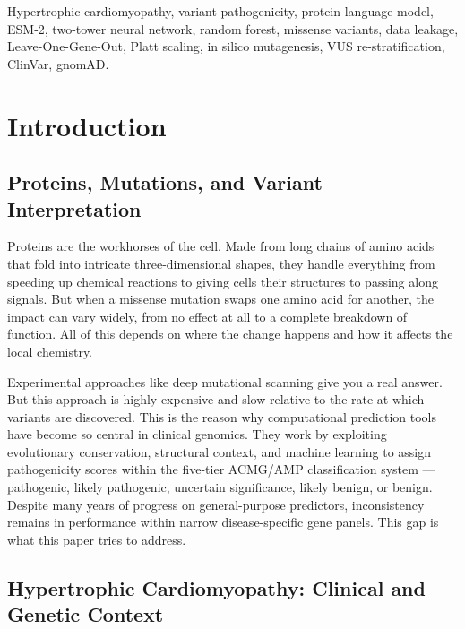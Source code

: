 \documentclass[conference]{IEEEtran}
\begin{document}
\begin{IEEEkeywords}
Hypertrophic cardiomyopathy, variant pathogenicity, protein language
model, ESM-2, two-tower neural network, random forest, missense
variants, data leakage, Leave-One-Gene-Out, Platt scaling, in silico
mutagenesis, VUS re-stratification, ClinVar, gnomAD.
\end{IEEEkeywords}

\section{Introduction}

\subsection{Proteins, Mutations, and Variant Interpretation}

Proteins are the workhorses of the cell. Made from long chains of amino acids that fold into intricate three-dimensional shapes, they handle everything from speeding up chemical reactions to giving cells their structures to passing along signals. But when a missense mutation swaps one amino acid for another, the impact can vary widely, from no effect at all to a complete breakdown of function. All of this depends on where the change happens and how it affects the local chemistry.

Experimental approaches like deep mutational scanning \cite{fowler2014deep} give you a real answer. But this approach is highly expensive and slow relative to the rate at which variants are discovered. This is the reason why computational prediction tools have become so central in clinical genomics. They work by exploiting evolutionary conservation, structural context, and machine learning to assign pathogenicity scores within the five-tier ACMG/AMP classification system \cite{richards2015}---pathogenic, likely pathogenic, uncertain significance, likely benign, or benign. Despite many years of progress on general-purpose predictors, inconsistency remains in performance within narrow disease-specific gene panels. This gap is what this paper tries to address.


\subsection{Hypertrophic Cardiomyopathy: Clinical and Genetic Context}
\end{document}
